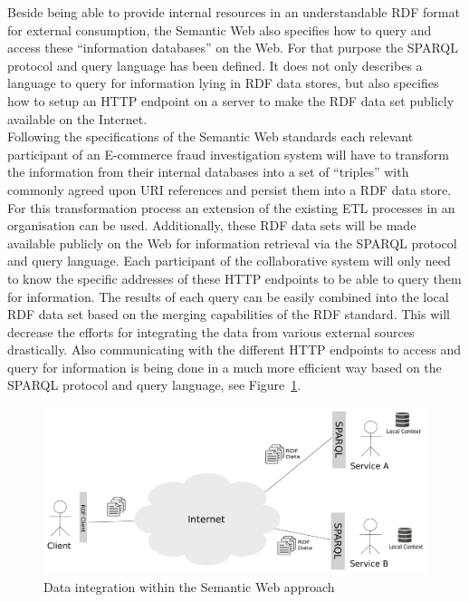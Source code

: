 Beside being able to provide internal resources in an understandable \gls{RDF} format for external consumption, the Semantic Web also specifies how to query and access these ``information databases'' on the Web. For that purpose the \gls{SPARQL} protocol and query language has been defined. It does not only describes a language to query for information lying in \gls{RDF} data stores, but also specifies how to setup an \gls{HTTP} endpoint on a server to make the \gls{RDF} data set publicly available on the Internet. \\

Following the specifications of the Semantic Web standards each relevant participant of an \gls{E-commerce} fraud investigation system will have to transform the information from their internal databases into a set of ``triples'' with commonly agreed upon \gls{URI} references and persist them into a \gls{RDF} data store. For this transformation process an extension of the existing \gls{ETL} processes in an organisation can be used. Additionally, these \gls{RDF} data sets will be made available publicly on the Web for information retrieval via the \gls{SPARQL} protocol and query language. Each participant of the collaborative system will only need to know the specific addresses of these \gls{HTTP} endpoints to be able to query them for information. The results of each query can be easily combined into the local \gls{RDF} data set based on the merging capabilities of the \gls{RDF} standard. This will decrease the efforts for integrating the data from various external sources drastically. Also communicating with the different \gls{HTTP} endpoints to access and query for information is being done in a much more efficient way based on the \gls{SPARQL} protocol and query language, see Figure~\ref{fig:web_data_scenario}. \@

\begin{figure}[H]
  \centering
  \includegraphics[width=0.9\columnwidth]{images/web-data-scenario.pdf}
  \caption{Data integration within the Semantic Web approach}
\label{fig:web_data_scenario}
\end{figure}

